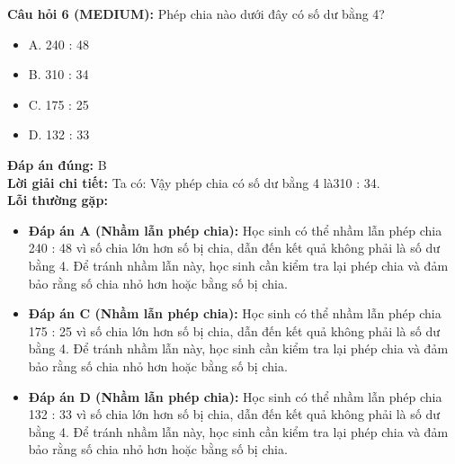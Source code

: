 \documentclass{article}
\begin{document}
\begin{minipage}{\textwidth}
\noindent\textbf{Câu hỏi 6 (MEDIUM):} Phép chia nào dưới đây có số dư bằng 4? 
\begin{itemize}[label={}]
    \item A. 240 : 48
    \item B. 310 : 34
    \item C. 175 : 25
    \item D. 132 : 33
\end{itemize}
\textbf{Đáp án đúng:} B \\
\textbf{Lời giải chi tiết:} Ta có: Vậy phép chia có số dư bằng 4 là310 : 34. \\
\textbf{Lỗi thường gặp:}
\begin{itemize}
  \item \textbf{Đáp án A (Nhầm lẫn phép chia):} Học sinh có thể nhầm lẫn phép chia 240 : 48 vì số chia lớn hơn số bị chia, dẫn đến kết quả không phải là số dư bằng 4. Để tránh nhầm lẫn này, học sinh cần kiểm tra lại phép chia và đảm bảo rằng số chia nhỏ hơn hoặc bằng số bị chia.
  \item \textbf{Đáp án C (Nhầm lẫn phép chia):} Học sinh có thể nhầm lẫn phép chia 175 : 25 vì số chia lớn hơn số bị chia, dẫn đến kết quả không phải là số dư bằng 4. Để tránh nhầm lẫn này, học sinh cần kiểm tra lại phép chia và đảm bảo rằng số chia nhỏ hơn hoặc bằng số bị chia.
  \item \textbf{Đáp án D (Nhầm lẫn phép chia):} Học sinh có thể nhầm lẫn phép chia 132 : 33 vì số chia lớn hơn số bị chia, dẫn đến kết quả không phải là số dư bằng 4. Để tránh nhầm lẫn này, học sinh cần kiểm tra lại phép chia và đảm bảo rằng số chia nhỏ hơn hoặc bằng số bị chia.
\end{itemize}
\end{minipage}
\vspace{1em}
\end{document}
